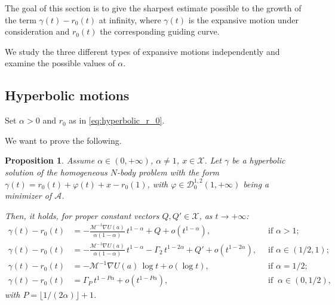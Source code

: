 \documentclass[a4paper,10pt]{amsart}
\theoremstyle{plain}
\newtheorem{prop}[thm]{Proposition}
\theoremstyle{definition}
\numberwithin{equation}{section}
\numberwithin{thm}{section}
\begin{document}
The goal of this section is to give the sharpest estimate possible to the growth of the term $\gamma(t)-r_0(t)$ at infinity, where $\gamma(t)$ is the expansive motion under consideration and $r_0(t)$ the corresponding guiding curve.

We study the three different types of expansive motions independently and examine the possible values of $\alpha$.





\subsection{Hyperbolic motions}

Set $\alpha >0$ and $r_0$ as in \eqref{eq:hyperbolic_r_0}. 


We want to prove the following.
\begin{prop}
\label{prop:asymp_H}
Assume $\alpha \in (0,+\infty)$, $\alpha\neq 1$, $x \in \mathcal X$. Let $\gamma$ be a hyperbolic solution of the homogeneous $N$-body problem with the form $\gamma(t) = r_0(t) + \varphi(t) + x - r_0(1)$, with $\varphi\in\mathcal{D}_0^{1,2}(1,+\infty)$ being a minimizer of $\mathcal A$.

    Then, it holds, for proper constant vectors $Q,Q'\in\mathcal{X}$, as $t \rightarrow+\infty$:
    \begin{align*}
    \label{eq:asym_hyp}
    \gamma(t)-r_0(t) &= -\frac{\mathcal M^{-1} \nabla U(a)}{\alpha(1-\alpha)}\,t^{1-\alpha} + Q + o(t^{1-\alpha}),\ &\text{ if } \alpha>1;
    \\
     \gamma(t)-r_0(t) &=-\frac{\mathcal M^{-1} \nabla U(a)}{\alpha(1-\alpha)}\,t^{1-\alpha}-\Gamma_2\,t^{1-2\alpha}+Q' + o(t^{1-2\alpha}),\ &\text{ if } \alpha \in (1/2,1);
     \\
     \gamma(t)-r_0(t) &=-\mathcal M^{-1} \nabla U(a)\,\log t+o(\log t),\ &\text{ if } \alpha=1/2;
     \\
     \gamma(t)-r_0(t)&=\Gamma_{P}\,t^{1-P\alpha}+o(t^{1-P\alpha}), \ &\text{ if } \ \alpha \in (0,1/2),
    \end{align*}
    with $P = \lfloor 1/(2\alpha)\rfloor + 1$.
    
\end{prop}
\end{document}

